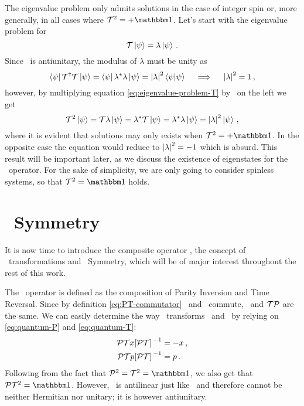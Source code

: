         The eigenvalue problem only admits solutions in the case of integer spin or, more generally, in all cases where $\hT^2 = +\togglehat{\idM}$. Let's start with the eigenvalue problem for \hT
        \begin{equation}
            \label{eq:eigenvalue-problem-T}
            \mathcal{{T}} \ket{\psi} = \lambda \ket{\psi}
            \,\text{.}
        \end{equation}
        Since \hT\ is antiunitary, the modulus of $\lambda$ must be unity as
        \begin{equation*}
            \bra{\psi} \mathcal{{T}}^\dag \mathcal{{T}} \ket{\psi}
            = \bra{\psi} \lambda^* \lambda \ket{\psi}
            = \abs{\lambda}^2 \braket{\psi}{\psi}
            \quad\implies\quad
            \abs{\lambda}^2 = 1
            \,\text{,}
        \end{equation*}
        however, by multiplying equation \eqref{eq:eigenvalue-problem-T} by \hT\ on the left we get
        \begin{equation*}
            \mathcal{{T}}^2 \ket{\psi}
            = \mathcal{{T}} \lambda \ket{\psi}
            = \lambda^* \mathcal{{T}} \ket{\psi}
            = \lambda^* \lambda \ket{\psi}
            = \abs{\lambda}^2 \ket{\psi}
            \,\text{,}
        \end{equation*}
        where it is evident that solutions may only exists when $\hT^2 = +\togglehat{\idM}$. In the opposite case the equation would reduce to $\abs{\lambda}^2 = -1$ which is absurd. This result will be important later, as we discuss the existence of eigenstates for the \hPT\ operator. For the sake of simplicity, we are only going to consider spinless systems, so that $\hT^2 = \togglehat{\idM}$ holds.

    \section{\PT\ Symmetry}
        It is now time to introduce the composite operator \hPT, the concept of \PT\ transformations and \PT\ Symmetry, which will be of major interest throughout the rest of this work.

        The \hPT\ operator is defined as the composition of Parity Inversion and Time Reversal. Since by definition \eqref{eq:PT-commutator} \hP\ and \hT\ commute, \hPT\ and $\mathcal{{T}}\mathcal{{P}}$ are the same. We can easily determine the way \hPT\ transforms \hx\ and \hp\ by relying on \eqref{eq:quantum-P} and \eqref{eq:quantum-T}:
        \begin{align}
            \label{eq:quantum-PT-x}
            \PTtransform{\hx}
            &= -\hx
            \mycomma
            \\
            \label{eq:quantum-PT-p}
            \PTtransform{\hp}
            &= \hp
            \myperiod
        \end{align}
        Following from the fact that $\hP^2 = \hT^2 = \togglehat{\idM}$, we also get that $\hPT^2 = \togglehat{\idM}$. However, \hPT\ is antilinear just like \hT\ and therefore cannot be neither Hermitian nor unitary; it is however antiunitary.

